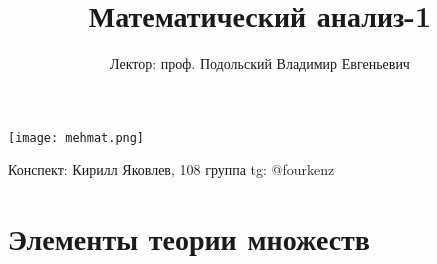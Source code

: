 \documentclass[a4paper, 12pt]{article}
\title{\textbf{Математический анализ-1}}
\author{Лектор: проф. Подольский Владимир Евгеньевич}
\newcommand\tab[1][.5cm]{\hspace*{#1}}
\theoremstyle{definition}
\begin{document}
    \fontsize{14pt}{20pt}\selectfont
    \maketitle
    \vspace{0.3cm}
    \begin{center}
        \texttt{[image: mehmat.png]}
    \end{center}
    \vspace{1.5cm}
    \begin{center}
        Конспект: Кирилл Яковлев, 108 группа \tab[5.5cm] tg: @fourkenz
    \end{center}
    \newpage
    \tableofcontents
    \fontsize{14pt}{20pt}\selectfont
    \newpage

    \section{Элементы теории множеств}
\end{document}

